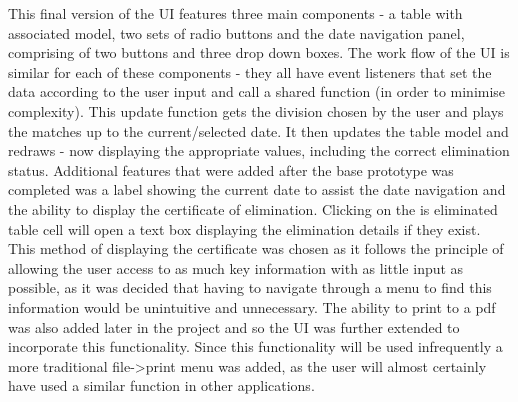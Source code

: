 This final version of the UI features three main components - a table with associated model, 
two sets of radio buttons and the date navigation panel, comprising of two buttons and three
drop down boxes. The work flow of the UI is similar for each of these components - they all 
have event listeners that set the data according to the user input and call a shared function 
(in order to minimise complexity). This update function gets the division chosen
by the user and plays the matches up to the current/selected date. It then updates the table 
model and redraws - now displaying the appropriate values, including the correct elimination status.
Additional features that were added after the base prototype was completed was a label
showing the current date to assist the date navigation and the ability
to display the certificate of elimination. Clicking on the is eliminated table cell will 
open a text box displaying the elimination details if they exist. This method of
displaying the certificate was chosen as it follows the principle of allowing the 
user access to as much key information with as little input as possible, as it was decided
that having to navigate through a menu to find this information would be unintuitive and 
unnecessary. The ability to print to a pdf was also added later in the project and so the 
UI was further extended to incorporate this functionality. Since this functionality will be
used infrequently a more traditional file->print menu was added, as the user will almost certainly
have used a similar function in other applications.